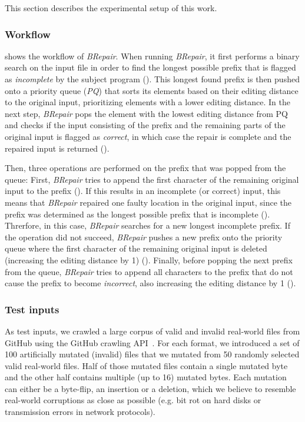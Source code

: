 \documentclass[sigconf,review,anonymous]{acmart}
\newcommand{\brepair}{\textit{BRepair}\xspace}
\begin{document}
This section describes the experimental setup of this work. 

\subsubsection*{\bf Workflow}
 shows the workflow of \brepair.
When running \brepair, it first performs a binary search on the input file in order to find the longest possible prefix that is flagged as \emph{incomplete} by the subject program ().
This longest found prefix is then pushed onto a priority queue (\emph{PQ}) that sorts its elements based on their editing distance to the original input, prioritizing elements with a lower editing distance.
In the next step, \brepair pops the element with the lowest editing distance from PQ and checks if the input consisting of the prefix and the remaining parts of the original input is flagged as \emph{correct}, in which case the repair is complete and the repaired input is returned ().\par
Then, three operations are performed on the prefix that was popped from the queue:
First, \brepair tries to append the first character of the remaining original input to the prefix ().
If this results in an incomplete (or correct) input, this means that \brepair repaired one faulty location in the original input, since the prefix was determined as the longest possible prefix that is incomplete ().
Threrfore, in this case, \brepair searches for a new longest incomplete prefix.
If the operation did not succeed, \brepair pushes a new prefix onto the priority queue where the first character of the remaining original input is deleted (increasing the editing distance by 1) ().
Finally, before popping the next prefix from the queue, \brepair tries to append all characters to the prefix that do not cause the prefix to become \emph{incorrect}, also increasing the editing distance by 1 ().

\subsubsection*{\bf Test inputs}
As test inputs, we crawled a large corpus of valid and invalid real-world files from GitHub using the GitHub crawling API~\cite{githubapi}.
For each format, we introduced a set of 100 artificially mutated (invalid) files that we mutated from 50 randomly selected valid real-world files.
Half of those mutated files contain a single mutated byte and the other half contains multiple (up to 16) mutated bytes.
Each mutation can either be a byte-flip, an insertion or a deletion, which we believe to resemble real-world corruptions as close as possible (e.g. bit rot on hard disks or transmission errors in network protocols).
\end{document}
